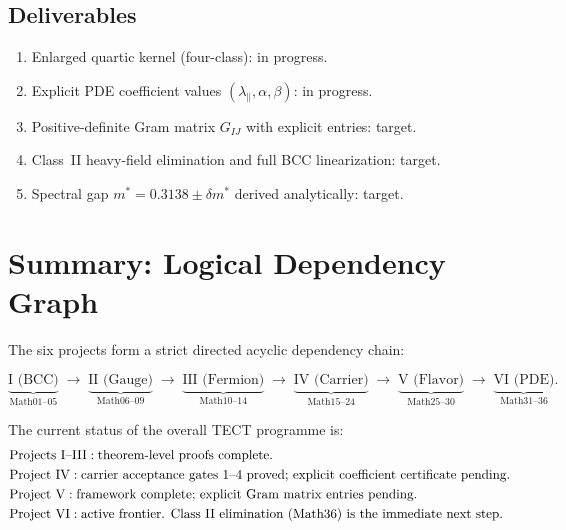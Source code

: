 \documentclass[reprint,aps,pre,onecolumn,superscriptaddress,amsmath,amssymb]{revtex4-2}
\begin{document}
\subsection{Deliverables}
\begin{enumerate}
  \item Enlarged quartic kernel (four-class): in progress.
  \item Explicit PDE coefficient values $(\lambda_{\parallel}, \alpha, \beta)$: in progress.
  \item Positive-definite Gram matrix $G_{IJ}$ with explicit entries: target.
  \item Class~II heavy-field elimination and full BCC linearization: target.
  \item Spectral gap $m^{*} = 0.3138 \pm \delta m^{*}$ derived analytically: target.
\end{enumerate}

\section{Summary: Logical Dependency Graph}
\label{sec:summary}

The six projects form a strict directed acyclic dependency chain:

\begin{equation}
  \underbrace{\text{I (BCC)}}_{\text{Math01--05}}
  \;\longrightarrow\;
  \underbrace{\text{II (Gauge)}}_{\text{Math06--09}}
  \;\longrightarrow\;
  \underbrace{\text{III (Fermion)}}_{\text{Math10--14}}
  \;\longrightarrow\;
  \underbrace{\text{IV (Carrier)}}_{\text{Math15--24}}
  \;\longrightarrow\;
  \underbrace{\text{V (Flavor)}}_{\text{Math25--30}}
  \;\longrightarrow\;
  \underbrace{\text{VI (PDE)}}_{\text{Math31--36}}.
  \label{eq:dependency-chain}
\end{equation}

The current status of the overall TECT programme is:
\begin{align}
  &\text{Projects I--III}: \text{theorem-level proofs complete.} \notag\\
  &\text{Project IV}: \text{carrier acceptance gates 1--4 proved;
    explicit coefficient certificate pending.} \notag\\
  &\text{Project V}: \text{framework complete;
    explicit Gram matrix entries pending.} \notag\\
  &\text{Project VI}: \text{active frontier.
    Class~II elimination (Math36) is the immediate next step.}
  \label{eq:overall-status}
\end{align}
\end{document}

